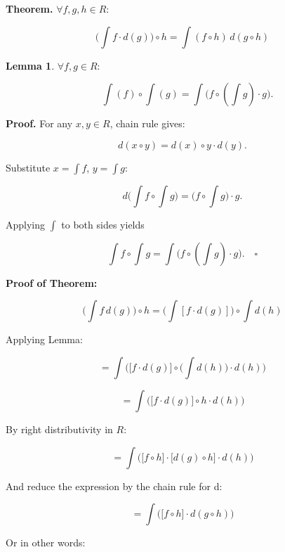 \documentclass[12pt]{article}
\theoremstyle{definition}
\newtheorem*{lemmastar}{Lemma}
\begin{document}
\vspace{15pt}
\noindent\textbf{Theorem.} $\forall f, g, h \in R:$

\[
\big(\int f \cdot d(g)\big) \circ h = \int (f \circ h) \, d(g \circ h)
\]

\vspace{5pt}

\begin{lemmastar} $\forall f, g \in R:$ 

\[
\quad \int(f) \circ \int(g) = \int \big(f \circ (\int g) \cdot g \big).
\]

\vspace{10pt}
\textbf{Proof.}  For any $x, y \in R$, chain rule gives:

\[
d(x \circ y) = d(x) \circ y \cdot d(y).
\]  

\vspace{5pt}
Substitute $x = \int f$, $y = \int g$:  

\[
d\big(\int f \circ \int g\big) = \big(f \circ \int g \big) \cdot g.
\]  

\newpage
Applying $\int$ to both sides yields  

\[
\int f \circ \int g = \int \big(f \circ (\int g) \cdot g \big). \quad \square
\] 

\end{lemmastar}

\vspace{15pt}
\noindent\textbf{Proof of Theorem:}

\[
\big(\int f \, d(g)\big) \circ h = \big(\int [f \cdot d(g)]\big) \circ \int d(h)
\]

\vspace{5pt}
Applying Lemma:

\[
= \int\big(\big[f \cdot d(g)\big] \circ \big(\int d(h)\big) \cdot d(h)\big) 
\]  

\[
= \int\big(\big[f \cdot d(g)\big] \circ h \cdot d(h)\big)
\]  

\vspace{5pt}
By right distributivity in $R$:  

\[
= \int \big(\big[f \circ h \big] \cdot \big[d(g) \circ h \big] \cdot d(h)\big)
\]  

\vspace{5pt}
And reduce the expression by the chain rule for d:

\[
= \int \big(\big[f \circ h \big] \cdot d(g \circ h))
\]  

\vspace{5pt}
Or in other words:
\end{document}
